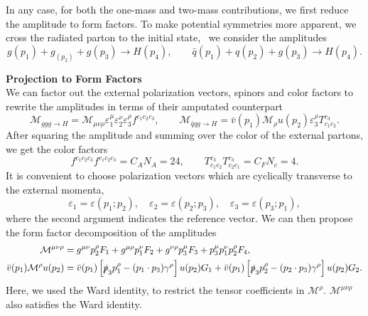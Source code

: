 In any case, for both the one-mass and two-mass contributions, we first reduce the amplitude to form factors. To make potential symmetries more apparent, we cross the radiated parton to the initial state, \ie\ we consider the amplitudes
\begin{equation}
g(p_1) + g_(p_2) + g(p_3) \longrightarrow H(p_4), \qquad \bar{q}(p_1) + q(p_2) + g(p_3) \longrightarrow H(p_4).
\end{equation}

\textbf{Projection to Form Factors}\\
We can factor out the external polarization vectors, spinors and color factors to rewrite the amplitudes in terms of their amputated counterpart
\begin{equation}
\mathcal{M}_{ggg \rightarrow H} = \mathcal{M}_{\mu \nu \rho} \varepsilon_1^\mu \varepsilon_2^\nu \varepsilon_3^\rho f^{c_1 c_2 c_3}, \qquad \mathcal{M}_{\bar{q} q g \rightarrow H} = \bar{v}(p_1) \mathcal{M}_{\rho} u(p_2) \varepsilon_3^\rho T^{c_3}_{c_1 c_2}.
\end{equation}
After squaring the amplitude and summing over the color of the external partons, we get the color factors
\begin{equation}
f^{c_1 c_2 c_3} f^{c_1 c_2 c_3} = C_A N_A = 24, \qquad T^{c_3}_{c_1 c_2} T^{c_{3}}_{c_2 c_1} = C_F N_c = 4.
\end{equation}
It is convenient to choose polarization vectors which are cyclically transverse to the external momenta, \ie\
\begin{equation}
\varepsilon_1 = \varepsilon (p_1; p_2), \quad \varepsilon_2 = \varepsilon (p_2; p_3), \quad \varepsilon_3 = \varepsilon (p_3; p_1),
\end{equation}
where the second argument indicates the reference vector. We can then propose the form factor decomposition of the amplitudes
\begin{equation}
\begin{split}
\mathcal{M}^{\mu \nu \rho} &= g^{\mu \nu} p_2^\rho F_1 + g^{\mu \rho} p_1^\nu F_2 + g^{\nu \rho} p_3^\mu F_3 + p_3^\mu p_1^\nu p_2^\rho F_4, \\
\bar{v}(p_1) \mathcal{M}^{\rho} u(p_2) &= \bar{v}(p_1)\left[ \slashed{p}_3 p_1^\rho - (p_1 \cdot p_3) \gamma^\rho \right] u(p_2) G_1 + \bar{v}(p_1) \left[ \slashed{p}_3 p_2^\rho - (p_2 \cdot p_3) \gamma^\rho \right] u(p_2) G_2.
\end{split}
\end{equation}
Here, we used the Ward identity, to restrict the tensor coefficients in $\mathcal{M}^\rho$. $\mathcal{M}^{\mu \nu \rho}$ also satisfies the Ward identity.

